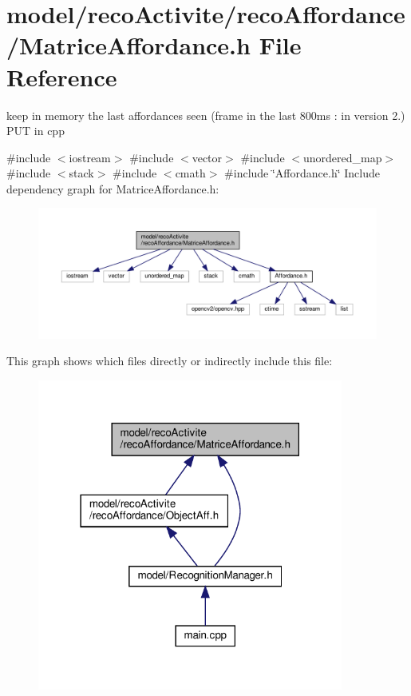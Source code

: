 \section{model/reco\+Activite/reco\+Affordance/\+Matrice\+Affordance.h File Reference}
\label{_matrice_affordance_8h}


keep in memory the last affordances seen (frame in the last 800ms \+: in version 2.) P\+UT in cpp  


{\ttfamily \#include $<$iostream$>$}\newline
{\ttfamily \#include $<$vector$>$}\newline
{\ttfamily \#include $<$unordered\+\_\+map$>$}\newline
{\ttfamily \#include $<$stack$>$}\newline
{\ttfamily \#include $<$cmath$>$}\newline
{\ttfamily \#include \char`\"{}Affordance.\+h\char`\"{}}\newline
Include dependency graph for Matrice\+Affordance.\+h\+:
\nopagebreak
\begin{figure}[H]
\begin{center}
\leavevmode
\includegraphics[width=350pt]{_matrice_affordance_8h__incl}
\end{center}
\end{figure}
This graph shows which files directly or indirectly include this file\+:
\nopagebreak
\begin{figure}[H]
\begin{center}
\leavevmode
\includegraphics[width=285pt]{_matrice_affordance_8h__dep__incl}
\end{center}
\end{figure}
